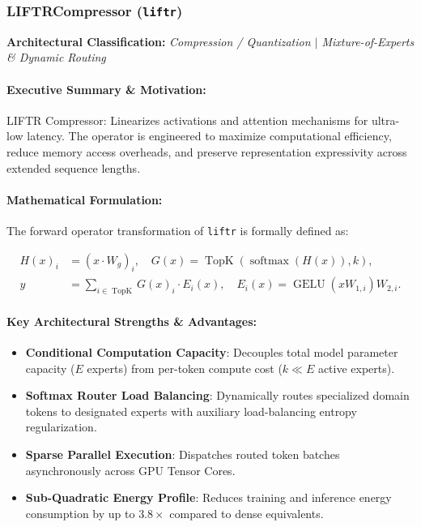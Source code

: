 \subsubsection{LIFTRCompressor (\texttt{liftr})}
\label{sec:module_liftr}

\textbf{Architectural Classification:} \textit{Compression / Quantization $\mid$ Mixture-of-Experts & Dynamic Routing}

\paragraph{Executive Summary \& Motivation:}
LIFTR Compressor: Linearizes activations and attention mechanisms for ultra-low latency. The operator is engineered to maximize computational efficiency, reduce memory access overheads, and preserve representation expressivity across extended sequence lengths.

\paragraph{Mathematical Formulation:}
The forward operator transformation of \texttt{liftr} is formally defined as:

\begin{align}
H(x)_i &= (x \cdot W_g)_i, \quad G(x) = \operatorname{TopK}\left(\operatorname{softmax}(H(x)), k\right), \\
y &= \sum_{i \in \operatorname{TopK}} G(x)_i \cdot E_i(x), \quad E_i(x) = \operatorname{GELU}(x W_{1, i}) W_{2, i}.
\end{align}


\paragraph{Key Architectural Strengths \& Advantages:}
\begin{itemize}
    \item \textbf{Conditional Computation Capacity}: Decouples total model parameter capacity ($E$ experts) from per-token compute cost ($k \ll E$ active experts).
    \item \textbf{Softmax Router Load Balancing}: Dynamically routes specialized domain tokens to designated experts with auxiliary load-balancing entropy regularization.
    \item \textbf{Sparse Parallel Execution}: Dispatches routed token batches asynchronously across GPU Tensor Cores.
    \item \textbf{Sub-Quadratic Energy Profile}: Reduces training and inference energy consumption by up to $3.8\times$ compared to dense equivalents.
\end{itemize}

